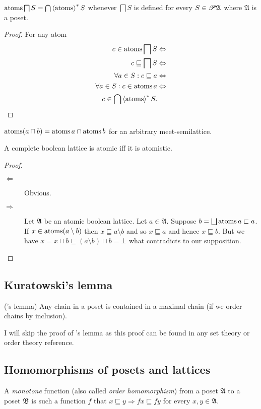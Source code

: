 \begin{thm}\label{atoms-infmeet}
$\operatorname{atoms}\bigsqcap S=\bigcap\left\langle \operatorname{atoms}\right\rangle ^{\ast}S$ whenever $\bigsqcap S$
is defined for every $S\in\mathscr{P}\mathfrak{A}$ where $\mathfrak{A}$
is a poset.\end{thm}
\begin{proof}
For any atom
\begin{align*}
c\in\operatorname{atoms}\bigsqcap S & \Leftrightarrow\\
c\sqsubseteq\bigsqcap S & \Leftrightarrow\\
\forall a\in S:c\sqsubseteq a & \Leftrightarrow\\
\forall a\in S:c\in\operatorname{atoms} a & \Leftrightarrow\\
c\in\bigcap\left\langle \operatorname{atoms}\right\rangle ^{\ast}S.
\end{align*}
\end{proof}
\begin{cor}
\label{atoms-meet}$\operatorname{atoms}(a\sqcap b)=\operatorname{atoms} a\cap\operatorname{atoms} b$ for an
arbitrary meet-semilattice.\end{cor}
\begin{thm}
A complete boolean lattice is atomic iff it is atomistic.\end{thm}
\begin{proof}
~
\begin{description}
\item [{$\Leftarrow$}] Obvious.
\item [{$\Rightarrow$}] Let $\mathfrak{A}$ be an atomic boolean lattice.
Let $a\in\mathfrak{A}$. Suppose $b=\bigsqcup\atoms a\sqsubset a$.
If $x\in\operatorname{atoms}(a\setminus b)$ then $x\sqsubseteq a\setminus b$ and
so $x\sqsubseteq a$ and hence $x\sqsubseteq b$. But we have $x=x\sqcap b\sqsubseteq(a\setminus b)\sqcap b=\bot$
what contradicts to our supposition.
\end{description}
\end{proof}

\subsection{Kuratowski's lemma}
\begin{thm}
('s lemma) Any chain in a poset is contained in a maximal
chain (if we order chains by inclusion).
\end{thm}
I will skip the proof of 's lemma as this proof can be found
in any set theory or order theory reference.


\subsection{Homomorphisms of posets and lattices}
\begin{defn}
A \emph{monotone} function
(also called \emph{order homomorphism}) from a poset $\mathfrak{A}$
to a poset $\mathfrak{B}$ is such a function $f$ that $x\sqsubseteq y\Rightarrow fx\sqsubseteq fy$
for every $x,y\in\mathfrak{A}$.
\end{defn}

